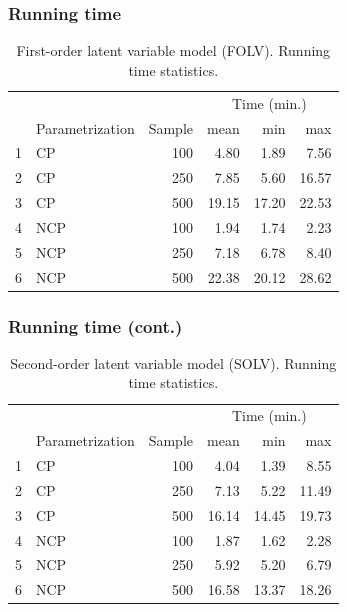 \documentclass[nonav,sleutel]{beamer}
\begin{document}
	\begin{frame}
		\frametitle{Running time }
		\begin{table}[h]
			\centering
			\begin{tabular}{rlrrrr}
				\hline
				\multicolumn{3}{c}{ }& \multicolumn{3}{c}{ Time (min.) } \\ 
				\cmidrule(rl){4-6} 
				& Parametrization & Sample & mean & min & max \\ 
				\hline\hline
				1 & CP & 100 & 4.80 & 1.89 & 7.56 \\ 
				2 & CP & 250 & 7.85 & 5.60 & 16.57 \\ 
				3 & CP & 500 & 19.15 & 17.20 & 22.53 \\ 
				\hline
				4 & NCP & 100 & 1.94 & 1.74 & 2.23 \\ 
				5 & NCP & 250 & 7.18 & 6.78 & 8.40 \\ 
				6 & NCP & 500 & 22.38 & 20.12 & 28.62 \\
				\hline
			\end{tabular}
			\caption{First-order latent variable model (FOLV). Running time statistics.} 
			\label{tab:FOLV_time}
		\end{table}
	\end{frame}
	\begin{frame}
		\frametitle{Running time (cont.)}
		\begin{table}[h]
			\centering
			\begin{tabular}{rlrrrr}
				\hline
				\multicolumn{3}{c}{ }& \multicolumn{3}{c}{ Time (min.) } \\ 
				\cmidrule(rl){4-6} 
				& Parametrization & Sample & mean & min & max \\ 
				\hline\hline
				1 & CP & 100 & 4.04 & 1.39 & 8.55 \\ 
				2 & CP & 250 & 7.13 & 5.22 & 11.49 \\ 
				3 & CP & 500 & 16.14 & 14.45 & 19.73 \\ 
				\hline
				4 & NCP & 100 & 1.87 & 1.62 & 2.28 \\ 
				5 & NCP & 250 & 5.92 & 5.20 & 6.79 \\ 
				6 & NCP & 500 & 16.58 & 13.37 & 18.26 \\
				\hline
			\end{tabular}
			\caption{Second-order latent variable model (SOLV). Running time statistics.} 
			\label{tab:SOLV_time}
		\end{table}
	\end{frame}
\end{document}
